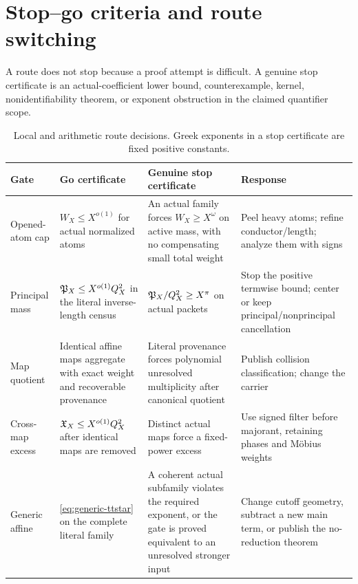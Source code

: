 \section{Stop--go criteria and route switching}
\label{sec:stop-go}

A route does not stop because a proof attempt is difficult.  A genuine
stop certificate is an actual-coefficient lower bound,
counterexample, kernel, nonidentifiability theorem, or exponent
obstruction in the claimed quantifier scope.

\begin{table}[ht]
\centering
\scriptsize
\begin{tabularx}{\textwidth}{@{}
  >{\raggedright\arraybackslash}p{1.8cm}Y Y Y@{}}
\toprule
Gate & Go certificate & Genuine stop certificate & Response\\
\midrule
Opened-atom cap &
\(W_X\le X^{o(1)}\) for actual normalized atoms &
An actual family forces \(W_X\ge X^\omega\) on active mass, with no
compensating small total weight &
Peel heavy atoms; refine conductor/length; analyze them with signs\\

Principal mass &
\(\mathfrak P_X\le X^{o(1)}Q_X^2\) in the literal inverse-length census &
\(\mathfrak P_X/Q_X^2\ge X^\pi\) on actual packets &
Stop the positive termwise bound; center or keep
principal/nonprincipal cancellation\\

Map quotient &
Identical affine maps aggregate with exact weight and recoverable
provenance &
Literal provenance forces polynomial unresolved multiplicity after
canonical quotient &
Publish collision classification; change the carrier\\

Cross-map excess &
\(\mathfrak X_X\le X^{o(1)}Q_X^2\) after identical maps are removed &
Distinct actual maps force a fixed-power excess &
Use signed filter before majorant, retaining phases and M\"obius
weights\\

Generic affine &
\eqref{eq:generic-ttstar} on the complete literal family &
A coherent actual subfamily violates the required exponent, or the
gate is proved equivalent to an unresolved stronger input &
Change cutoff geometry, subtract a new main term, or publish the
no-reduction theorem\\
\bottomrule
\end{tabularx}
\caption{Local and arithmetic route decisions.  Greek exponents in a
stop certificate are fixed positive constants.}
\label{tab:stop-local}
\end{table}

